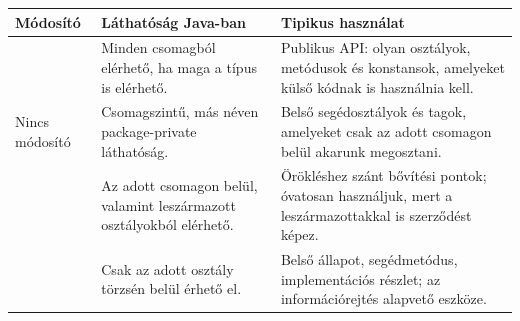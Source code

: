 \begin{tabularx}{\textwidth}{L{26mm}L{38mm}X}
\toprule
\textbf{Módosító} & \textbf{Láthatóság Java-ban} & \textbf{Tipikus használat} \\
\midrule
{} & Minden csomagból elérhető, ha maga a típus is elérhető. & Publikus API: olyan osztályok, metódusok és konstansok, amelyeket külső kódnak is használnia kell. \\
Nincs módosító & Csomagszintű, más néven package-private láthatóság. & Belső segédosztályok és tagok, amelyeket csak az adott csomagon belül akarunk megosztani. \\
 & Az adott csomagon belül, valamint leszármazott osztályokból elérhető. & Örökléshez szánt bővítési pontok; óvatosan használjuk, mert a leszármazottakkal is szerződést képez. \\
 & Csak az adott osztály törzsén belül érhető el. & Belső állapot, segédmetódus, implementációs részlet; az információrejtés alapvető eszköze. \\
\bottomrule
\end{tabularx}
